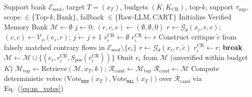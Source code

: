 \documentclass[11pt,letterpaper,onecolumn]{article}
\begin{document}
\begin{algorithm}[htbp]
\caption{Two-Phase Counterexample-Refined VLEG and Neuro-Symbolic Rule Triage}
\label{alg:vleg_final}
\footnotesize
\begin{algorithmic}[1]
\Require Support bank $\mathcal{E}_{\mathrm{seed}}$, target $T=(x_T)$, budgets $(K, K_{\mathrm{CR}})$, top-$k$, support $\tau_{\mathrm{sup}}$, scope $\in \{\text{Top-}k, \text{Bank}\}$, fallback $\in \{\text{Raw-LLM}, \text{CART}\}$
\State Initialize Verified Memory Bank $\mathcal{M} \gets \emptyset$
 
    \State $j \gets 0$; $(r, c, v) \gets (\emptyset, \emptyset, 0)$
        \State $r \gets \mathcal{G}_\theta(x_i, r, c)$; $(v, c) \gets \mathcal{V}_\phi(e_i, r)$; $j \gets j + 1$
    \EndWhile
     
        \State $r_i^{\mathrm{CR}} \gets \emptyset$
            \State $r_i^{\mathrm{CR}} \gets r$
        \Else {}
                \State Construct critique $\tilde{c}$ from falsely matched contrary flows in $\mathcal{E}_{\mathrm{seed}} \setminus \{e_i\}$
                \State $r \gets \mathcal{G}_\theta(x_i, r, \tilde{c})$
                    \State $r_i^{\mathrm{CR}} \gets r$; \textbf{break}
                \EndIf
            \EndFor
        \EndIf
        \State $\mathcal{M} \gets \mathcal{M} \cup \{(e_i, r_i^{\mathrm{CR}}, S_{\mathrm{pos}}(r_i^{\mathrm{CR}}))\}$
    \Else
        \State Omit $e_i$ from $\mathcal{M}$ (unverified within budget $K$)
    \EndIf
\EndFor
{} 
    \State $\mathcal{M}_{\mathrm{top}} \gets \mathrm{Retrieve}(\mathcal{M}, x_T, k)$; $\mathcal{R}_{\mathrm{cand}} \gets \mathcal{M}_{\mathrm{top}}$
\Else
    \State $\mathcal{R}_{\mathrm{cand}} \gets \mathcal{M}$ 
\EndIf
\State Compute deterministic votes $\big(\mathrm{Vote}_{\texttt{BEN}}(x_T), \mathrm{Vote}_{\texttt{MAL}}(x_T)\big)$ over $\mathcal{R}_{\mathrm{cand}}$ via Eq.~(\ref{eq:ns_votes})

\end{algorithmic}
\end{algorithm}
\end{document}
